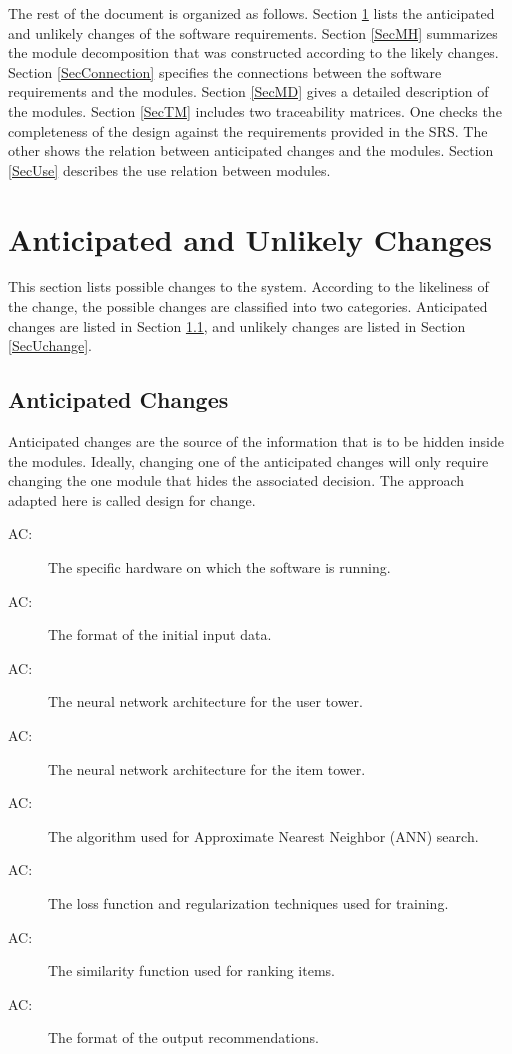 \documentclass[12pt, titlepage]{article}
\newcounter{acnum}
\newcommand{\actheacnum}{AC\theacnum}
\begin{document}
The rest of the document is organized as follows. Section
\ref{SecChange} lists the anticipated and unlikely changes of the software
requirements. Section \ref{SecMH} summarizes the module decomposition that
was constructed according to the likely changes. Section \ref{SecConnection}
specifies the connections between the software requirements and the
modules. Section \ref{SecMD} gives a detailed description of the
modules. Section \ref{SecTM} includes two traceability matrices. One checks
the completeness of the design against the requirements provided in the SRS. The
other shows the relation between anticipated changes and the modules. Section
\ref{SecUse} describes the use relation between modules.

\section{Anticipated and Unlikely Changes} \label{SecChange}

This section lists possible changes to the system. According to the likeliness
of the change, the possible changes are classified into two
categories. Anticipated changes are listed in Section \ref{SecAchange}, and
unlikely changes are listed in Section \ref{SecUchange}.

\subsection{Anticipated Changes} \label{SecAchange}

Anticipated changes are the source of the information that is to be hidden
inside the modules. Ideally, changing one of the anticipated changes will only
require changing the one module that hides the associated decision. The approach
adapted here is called design for
change.

\begin{description}
\item[ \actheacnum \label{acHardware}:] The specific
  hardware on which the software is running.
\item[ \actheacnum \label{acInput}:] The format of the
  initial input data.
\item[ \actheacnum \label{acUserNN}:] The neural network architecture for the user tower.
\item[ \actheacnum \label{acItemNN}:] The neural network architecture for the item tower.
\item[ \actheacnum \label{acANN}:] The algorithm used for Approximate Nearest Neighbor (ANN) search.
\item[ \actheacnum \label{acLoss}:] The loss function and regularization techniques used for training.
\item[ \actheacnum \label{acSimilarity}:] The similarity function used for ranking items.
\item[ \actheacnum \label{acOutputFormat}:] The format of the output recommendations.
\end{description}
\end{document}
